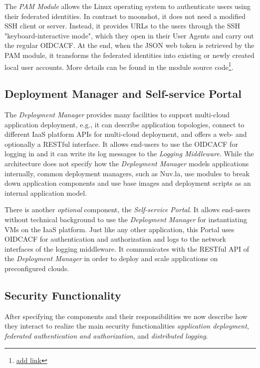 \documentclass{llncs}
\begin{document}
The \textit{PAM Module} allows the Linux operating system to authenticate users using their federated identities. In contrast to moonshot, it does not need a modified SSH client or server. Instead, it provides URLs to the users through the SSH "keyboard-interactive mode", which they open in their User Agents and carry out the regular OIDCACF. At the end, when the JSON web token is retrieved by the PAM module, it transforms the federated identities into existing or newly created local user accounts. More details can be found in the module source code\footnote{\url{add link}}.

\subsection{Deployment Manager and Self-service Portal}

The \textit{Deployment Manager} provides many facilities to support multi-cloud application deployment, e.g., it can describe application topologies, connect to different IaaS platform APIs for multi-cloud deployment, and offers a web- and optionally a RESTful interface. It allows end-users to use the OIDCACF for logging in and it can write its log messages to the \textit{Logging Middleware}. While the architecture does not specify how the \textit{Deployment Manager} models applications internally, common deployment managers, such as Nuv.la, use modules to break down application components and use base images and deployment scripts as an internal application model.

There is another \textit{optional} component, the \textit{Self-service Portal}. It allows end-users without technical background to use the \textit{Deployment Manager} for instantiating VMs on the IaaS platform. Just like any other application, this Portal uses OIDCACF for authentication and authorization and logs to the network interfaces of the logging middleware. It communicates with the RESTful API of the \textit{Deployment Manager} in order to deploy and scale applications on preconfigured clouds.

\subsection{Security Functionality}

After specifying the components and their responsibilities we now describe how they interact to realize the main security functionalities \textit{application deployment}, \textit{federated authentication and authorization}, and \textit{distributed logging}.
\end{document}
